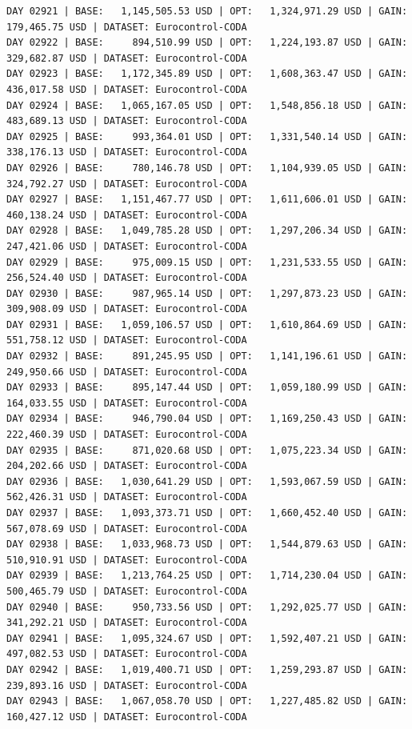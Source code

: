 \documentclass[11pt,a4paper]{article}
\begin{document}
\begin{verbatim}
DAY 02921 | BASE:   1,145,505.53 USD | OPT:   1,324,971.29 USD | GAIN: 179,465.75 USD | DATASET: Eurocontrol-CODA
DAY 02922 | BASE:     894,510.99 USD | OPT:   1,224,193.87 USD | GAIN: 329,682.87 USD | DATASET: Eurocontrol-CODA
DAY 02923 | BASE:   1,172,345.89 USD | OPT:   1,608,363.47 USD | GAIN: 436,017.58 USD | DATASET: Eurocontrol-CODA
DAY 02924 | BASE:   1,065,167.05 USD | OPT:   1,548,856.18 USD | GAIN: 483,689.13 USD | DATASET: Eurocontrol-CODA
DAY 02925 | BASE:     993,364.01 USD | OPT:   1,331,540.14 USD | GAIN: 338,176.13 USD | DATASET: Eurocontrol-CODA
DAY 02926 | BASE:     780,146.78 USD | OPT:   1,104,939.05 USD | GAIN: 324,792.27 USD | DATASET: Eurocontrol-CODA
DAY 02927 | BASE:   1,151,467.77 USD | OPT:   1,611,606.01 USD | GAIN: 460,138.24 USD | DATASET: Eurocontrol-CODA
DAY 02928 | BASE:   1,049,785.28 USD | OPT:   1,297,206.34 USD | GAIN: 247,421.06 USD | DATASET: Eurocontrol-CODA
DAY 02929 | BASE:     975,009.15 USD | OPT:   1,231,533.55 USD | GAIN: 256,524.40 USD | DATASET: Eurocontrol-CODA
DAY 02930 | BASE:     987,965.14 USD | OPT:   1,297,873.23 USD | GAIN: 309,908.09 USD | DATASET: Eurocontrol-CODA
DAY 02931 | BASE:   1,059,106.57 USD | OPT:   1,610,864.69 USD | GAIN: 551,758.12 USD | DATASET: Eurocontrol-CODA
DAY 02932 | BASE:     891,245.95 USD | OPT:   1,141,196.61 USD | GAIN: 249,950.66 USD | DATASET: Eurocontrol-CODA
DAY 02933 | BASE:     895,147.44 USD | OPT:   1,059,180.99 USD | GAIN: 164,033.55 USD | DATASET: Eurocontrol-CODA
DAY 02934 | BASE:     946,790.04 USD | OPT:   1,169,250.43 USD | GAIN: 222,460.39 USD | DATASET: Eurocontrol-CODA
DAY 02935 | BASE:     871,020.68 USD | OPT:   1,075,223.34 USD | GAIN: 204,202.66 USD | DATASET: Eurocontrol-CODA
DAY 02936 | BASE:   1,030,641.29 USD | OPT:   1,593,067.59 USD | GAIN: 562,426.31 USD | DATASET: Eurocontrol-CODA
DAY 02937 | BASE:   1,093,373.71 USD | OPT:   1,660,452.40 USD | GAIN: 567,078.69 USD | DATASET: Eurocontrol-CODA
DAY 02938 | BASE:   1,033,968.73 USD | OPT:   1,544,879.63 USD | GAIN: 510,910.91 USD | DATASET: Eurocontrol-CODA
DAY 02939 | BASE:   1,213,764.25 USD | OPT:   1,714,230.04 USD | GAIN: 500,465.79 USD | DATASET: Eurocontrol-CODA
DAY 02940 | BASE:     950,733.56 USD | OPT:   1,292,025.77 USD | GAIN: 341,292.21 USD | DATASET: Eurocontrol-CODA
DAY 02941 | BASE:   1,095,324.67 USD | OPT:   1,592,407.21 USD | GAIN: 497,082.53 USD | DATASET: Eurocontrol-CODA
DAY 02942 | BASE:   1,019,400.71 USD | OPT:   1,259,293.87 USD | GAIN: 239,893.16 USD | DATASET: Eurocontrol-CODA
DAY 02943 | BASE:   1,067,058.70 USD | OPT:   1,227,485.82 USD | GAIN: 160,427.12 USD | DATASET: Eurocontrol-CODA

\end{verbatim}
\end{document}
